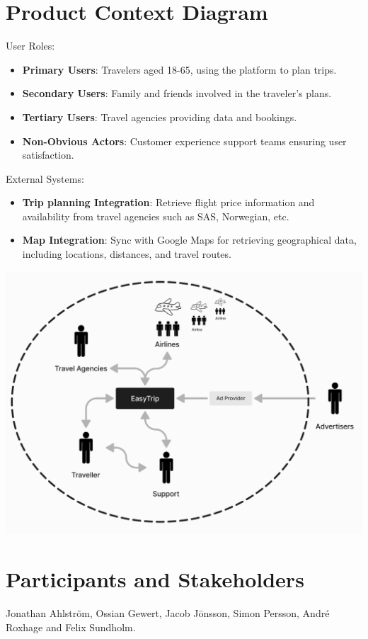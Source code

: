 \documentclass[a4paper]{article}
\begin{document}
\section{Product Context Diagram}
User Roles:
\begin{itemize}
    \item \textbf{Primary Users}: Travelers aged 18-65, using the platform to plan trips.
    \item \textbf{Secondary Users}: Family and friends involved in the traveler’s plans.
    \item \textbf{Tertiary Users}: Travel agencies providing data and bookings.
    \item \textbf{Non-Obvious Actors}: Customer experience support teams ensuring user satisfaction.
\end{itemize}

External Systems:
\begin{itemize}
    \item \textbf{Trip planning Integration}: Retrieve flight price information and availability from travel agencies such as SAS, Norwegian, etc.
    \item\textbf{Map Integration}: Sync with Google Maps for retrieving geographical data, including locations, distances, and travel routes.
\end{itemize}

\includegraphics[width=.95\textwidth]{../Release 1/resources/contextDiagram.png}


\section{Participants and Stakeholders}
Jonathan Ahlström, Ossian Gewert, Jacob Jönsson, Simon Persson, André Roxhage and Felix Sundholm.
\end{document}
